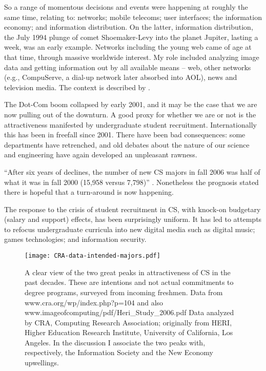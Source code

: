\documentclass{article}
\begin{document}
So a range of momentous decisions and events were happening at roughly the 
same time, relating to: networks; mobile telecoms; user interfaces;
the information economy; and information distribution.  On the latter, 
information distribution, the July 1994 plunge of comet Shoemaker-Levy
into the planet Jupiter, lasting a week, was an early example.  Networks 
including the young web came of age at that time, through massive 
worldwide interest.  My role included analyzing 
image data and getting information out by all available means -- web, 
other networks (e.g., CompuServe, a dial-up network later absorbed into
AOL), news and television media.  The context is 
described by \cite{whitehouse}.

The Dot-Com boom collapsed by early 2001, and it may be the case 
that we are now 
pulling out of the downturn.  
A good proxy for whether we are or not is the attractiveness manifested by 
undergraduate student recruitment.  Internationally
this has been in freefall since 2001.  
There have been bad consequences: some departments have retrenched, 
and old debates about the nature of our science and engineering have
again developed an unpleasant rawness.  

``After 
six years of declines, the number of new CS majors in fall 2006 was 
half of what it 
was in fall 2000 (15,958 versus 7,798)'' \cite{vegso1}.  
Nonetheless the prognosis 
stated there is hopeful that a turn-around is now happening.  

The response to the crisis of student recruitment in CS, with knock-on 
budgetary 
(salary and support) effects, has been surprisingly uniform.  It has led 
to attempts to 
refocus undergraduate curricula into new digital media such as 
digital music; 
games technologies; and information security.  


\begin{figure}
\texttt{[image: CRA-data-intended-majors.pdf]}
\caption{A clear view of the two great peaks in 
attractiveness of CS in the past decades.  
These are 
intentions and not actual commitments to degree programs, 
surveyed from incoming freshmen.  Data from 
www.cra.org/wp/index.php?p=104 and also 
www.imageofcomputing/pdf/Heri\_Study\_2006.pdf  Data analyzed by
CRA, Computing Research Association; 
originally from HERI, Higher Education Research Institute,
University of California, Los Angeles. In the discussion I 
associate the two peaks with, respectively, the Information 
Society and the New Economy upwellings.}    
\label{fig1}
\end{figure}
 
\end{document}
